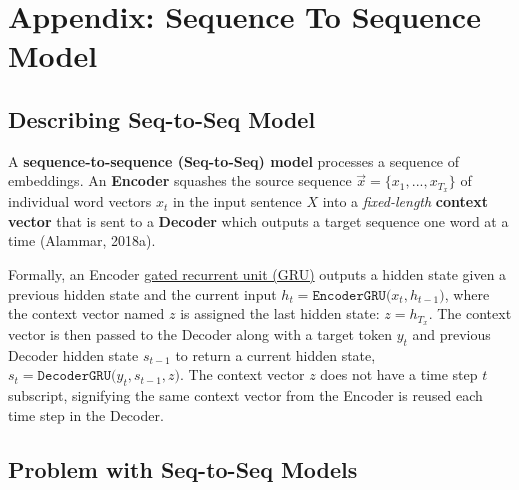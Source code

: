 \section{Appendix: Sequence To Sequence Model} \label{sec:Seq2Seq}

\subsection{Describing Seq-to-Seq Model}


A \textbf{sequence-to-sequence (Seq-to-Seq) model} processes a sequence of embeddings. An \textbf{Encoder} squashes the source sequence $\overrightarrow{x} = \{ x_1, ..., x_{T_x} \}$ of individual word vectors $x_t$ in the input sentence $X$ into a \emph{fixed-length} \textbf{context vector} that is sent to a \textbf{Decoder} which outputs a target sequence one word at a time (Alammar, 2018a). 

Formally, an Encoder \hyperref[sec:GRU]{gated recurrent unit (GRU)} outputs a hidden state given a previous hidden state and the current input $h_t = \texttt{EncoderGRU} \Big( x_t, h_{t-1} \Big)$, where the context vector named $z$ is assigned the last hidden state: $z = h_{T_x}$. The context vector is then passed to the Decoder along with a target token $y_t$ and previous Decoder hidden state $s_{t-1}$ to return a current hidden state, $s_t = \texttt{DecoderGRU} \Big( y_t, s_{t-1}, z \Big)$. The context vector $z$ does not have a time step $t$ subscript, signifying the same context vector from the Encoder is reused each time step in the Decoder. 






\subsection{Problem with Seq-to-Seq Models} \label{sec:ProblemWithSeq2Seq}

